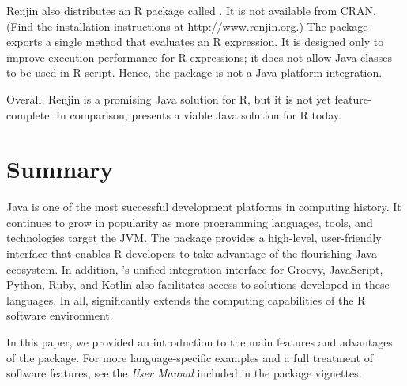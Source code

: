 Renjin also distributes an R package called . It is not available from CRAN. (Find the installation instructions at \url{http://www.renjin.org}.) The  package exports a single method that evaluates an R expression. It is designed only to improve execution performance for R expressions; it does not allow Java classes to be used in R script. Hence, the  package is not a Java platform integration.

Overall, Renjin is a promising Java solution for R, but it is not yet feature-complete. In comparison,  presents a viable Java solution for R today.

\section{Summary}

Java is one of the most successful development platforms in computing history. It continues to grow in popularity as more programming languages, tools, and technologies target the JVM. The  package provides a high-level, user-friendly interface that enables R developers to take advantage of the flourishing Java ecosystem. In addition, 's unified integration interface for Groovy, JavaScript, Python, Ruby, and Kotlin also facilitates access to solutions developed in these languages. In all,  significantly extends the computing capabilities of the R software environment.

In this paper, we provided an introduction to the main features and advantages of the  package. For more language-specific examples and a full treatment of software features, see the \textit{ User Manual} included in the package vignettes.



\address{Floid R. Gilbert\\
    Department of Statistics\\
    Brigham Young University\\
    Provo, UT 84602\\
    USA\\}

\address{David B. Dahl\\
    Department of Statistics\\
    Brigham Young University\\
    Provo, UT 84602\\
    USA\\}

